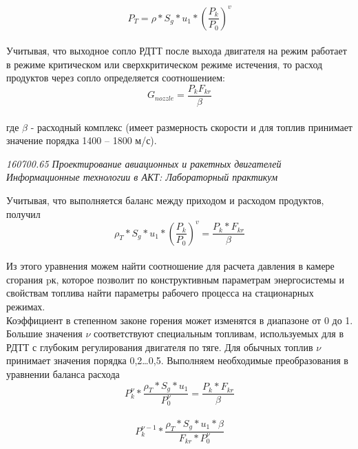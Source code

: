 \begin{equation}\label{eq:fourierrow} 
P_T = \rho * S_g *u_1 * {(\frac{P_k}{P_0})}^v
\end{equation}\\
Учитывая, что выходное сопло РДТТ после выхода двигателя на режим работает в режиме критическом или сверхкритическом режиме истечения, то расход продуктов через сопло определяется соотношением: \\
\begin{equation}\label{eq:fourierrow} 
G_{nozzle} = \frac{P_k F_{kr}}{\beta}
\end{equation}\\
где $\beta$ - расходный комплекс (имеет размерность скорости и для топлив принимает значение порядка 1400 – 1800 м/с).


\begin{flushright}
\begin{scriptsize}
\textit{160700.65   Проектирование авиационных и ракетных двигателей\\
 Информационные технологии в АКТ: Лабораторный практикум} \\
 \end{scriptsize}
\end{flushright}
Учитывая, что выполняется баланс между приходом и расходом продуктов, получил
\begin{equation}\label{eq:fourierrow} 
\rho_T * S_g * u_1 * {(\frac{P_k}{P_0})}^v = \frac{P_k * F_{kr}}{\beta}
\end{equation}\\
Из этого уравнения можем найти соотношение для расчета давления в камере сгорания pк, которое позволит по конструктивным параметрам энергосистемы и свойствам топлива найти параметры рабочего процесса на стационарных режимах.\\
Коэффициент в степенном законе горения может изменятся в диапазоне от 0 до 1. Большие значения $\nu$ соответствуют специальным топливам, используемых для в РДТТ с глубоким регулирования двигателя по тяге. Для обычных топлив $\nu$ принимает значения порядка 0,2…0,5.
Выполняем необходимые преобразования в уравнении баланса расхода
\begin{equation}\label{eq:fourierrow} 
P_k^\nu * \frac{\rho_T * S_g * u_1}{P_0^\nu } = \frac{P_k * F_{kr}}{\beta}
\end{equation}\\
\begin{equation}\label{eq:fourierrow} 
P_k^{\nu-1} * \frac{\rho_T * S_g * u_1 * \beta}{F_{kr} * P_0^\nu }
\end{equation}\
